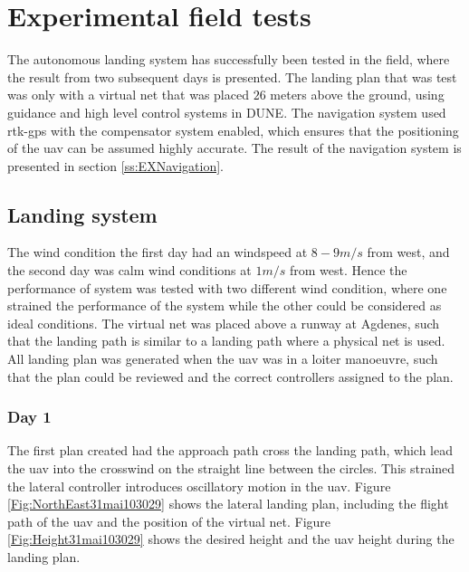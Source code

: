 \chapter{Experimental field tests}
The autonomous landing system has successfully been tested in the field, where the result from two subsequent days is presented. The landing plan that was test was only with a virtual net that was placed $26$ meters above the ground, using guidance and high level control systems in DUNE. The navigation system used \gls{rtk-gps} with the compensator system enabled, which ensures that the positioning of the \gls{uav} can be assumed highly accurate. The result of the navigation system is presented in section \ref{ss:EXNavigation}.
\section{Landing system}
The wind condition the first day had an windspeed at $8-9 m/s$ from west, and the second day was calm wind conditions at $1 m/s$ from west. Hence the performance of system was tested with two different wind condition, where one strained the performance of the system while the other could be considered as ideal conditions. The virtual net was placed above a runway at Agdenes, such that the landing path is similar to a landing path where a physical net is used. All landing plan was generated when the \gls{uav} was in a loiter manoeuvre, such that the plan could be reviewed and the correct controllers assigned to the plan.
\subsection{Day 1}
The first plan created had the approach path cross the landing path, which lead the \gls{uav} into the crosswind on the straight line between the circles. This strained the lateral controller introduces oscillatory motion in the \gls{uav}. Figure \ref{Fig:NorthEast31mai103029} shows the lateral landing plan, including the flight path of the \gls{uav} and the position of the virtual net. Figure \ref{Fig:Height31mai103029} shows the desired height and the \gls{uav} height during the landing plan.


